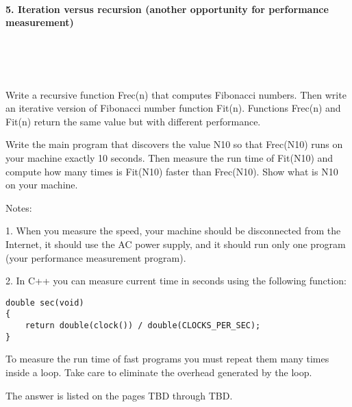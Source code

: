 \documentclass{article}
\begin{document}
	
	\rmfamily
	
	\paragraph{5. Iteration versus recursion (another opportunity for performance measurement) }\
	
	\rmfamily\
	
		Write a recursive function Frec(n) that computes Fibonacci numbers. Then write an iterative version of Fibonacci number function Fit(n). Functions Frec(n) and Fit(n) return the same value but with different performance.
		\newline
		
		Write the main program that discovers the value N10 so that Frec(N10) runs on your machine exactly 10 seconds. Then measure the run time of Fit(N10) and compute how many times is Fit(N10) faster than Frec(N10). Show what is N10 on your machine.
		\newline
		
		\noindent Notes:
		
		1. When you measure the speed, your machine should be disconnected from the Internet, it should use the AC power supply, and it should run only one program (your performance measurement program).
		
		2. In C++ you can measure current time in seconds using the following function:
		
		\begin{verbatim}
double sec(void)
{
    return double(clock()) / double(CLOCKS_PER_SEC);
}
		\end{verbatim}
		
		To measure the run time of fast programs you must repeat them many times inside a loop. Take care to eliminate the overhead generated by the loop.
		\newline
		
		The answer is listed on the pages TBD through TBD.

\paragraph{}\
\paragraph{}\
\end{document}
